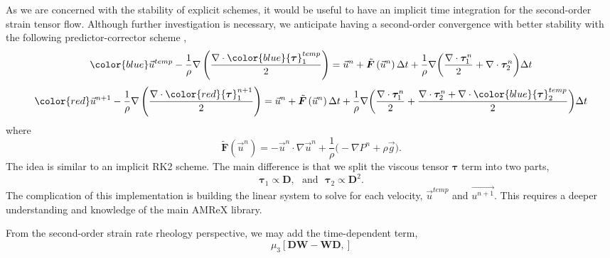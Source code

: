 \par
As we are concerned with the stability of explicit schemes, it would be useful to have an implicit time integration for the second-order strain tensor flow. Although further investigation is necessary, we anticipate having a second-order convergence with better stability with the following predictor-corrector scheme \cite{press_numerical_2007},
\[
{\color{blue}\vec{u}^{temp}} -
\frac{1}{\rho} \nabla
\left( 
\frac{\nabla \cdot {\color{blue}{\bm \tau}_1^{temp}}}{2}
\right)
=
\vec{u}^n
+ \tilde{\bm F} \left( \vec{u}^{n} \right) \Delta t
+ \frac{1}{\rho} \nabla \biggl(
\frac{ \nabla \cdot{\bm \tau}_1^n}{2} 
+ \nabla \cdot {\bm \tau}_2^n 
\biggr)\Delta t
\]
\[
{\color{red}\vec{u}^{n+1}} 
- \frac{1}{\rho}\nabla 
\left(
\frac{\nabla \cdot {\color{red}{\bm \tau}_1^{n+1}}}{2}
\right)
=
\vec{u}^n 
+ \tilde{\bm F} \left( \vec{u}^{n} \right) \Delta t
+ \frac{1}{\rho} \nabla \biggl(
\frac{ \nabla \cdot{\bm \tau}_1^n}{2} 
+ \frac{\nabla \cdot {\bm \tau}_2^{n} + \nabla \cdot {\color{blue}{\bm \tau}_2^{temp}}}{2} 
\biggr)\Delta t
\] 
where 
\[
  \tilde{\bm F} \left( \vec{u}^{n} \right)= 
    -\vec{u}^n \cdot \nabla \vec{u}^n 
    +\frac{1}{\rho}
    \biggl(
    - \nabla P^n 
        +  \rho  \vec{g} 
        \biggr).
\]
The idea is similar to an implicit RK2 scheme. The main difference is that we split the viscous tensor $\bm \tau$ term into two parts,
\[
{\bm \tau_1} \propto {\bm D}, \ \ \ {\text{and}} \ \ \  {\bm \tau_2} \propto {\bm D^2}.
\]
The complication of this implementation is building the linear system to solve for each velocity, $\vec{u}^{temp}$ and $\vec{u^{n+1}}$. This requires a deeper understanding and knowledge of the main AMReX library. 
\par
From the second-order strain rate rheology perspective, we may add the time-dependent term, 
\begin{equation}
  \mu_3  \left[ {\bm D}{\bm W} - {\bm W}{\bm D},\right]
  \end{equation}
